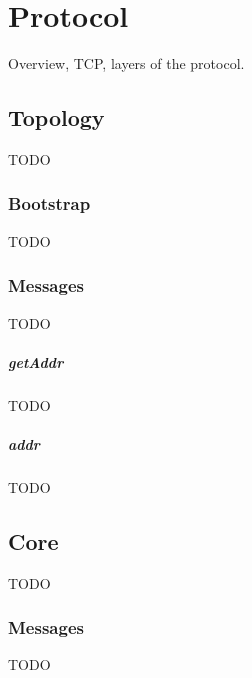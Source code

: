 \chapter{Protocol}
\label{chapter:protocol}
Overview, TCP, layers of the protocol.

\section{Topology}
TODO

\subsection{Bootstrap}
TODO

\subsection{Messages}
TODO

\paragraph{getAddr}
TODO

\paragraph{addr}
TODO

\section{Core}
TODO

\subsection{Messages}
TODO
